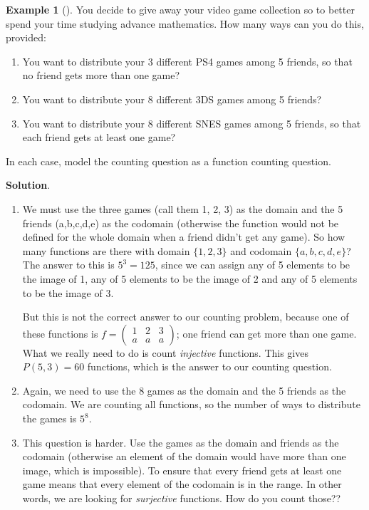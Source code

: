 \documentclass[10pt,]{book}
\theoremstyle{plain}
\theoremstyle{definition}
\theoremstyle{definition}
\newtheorem{example}[theorem]{Example}
\theoremstyle{definition}
\theoremstyle{definition}
\numberwithin{equation}{chapter}
\newcommand{\twoline}[2]{\begin{pmatrix}#1 \\ #2 \end{pmatrix}}
\newcommand{\amp}{&}
\begin{document}
\begin{example}[]\label{example-16}
\hypertarget{p-989}{}%
You decide to give away your video game collection so to better spend your time studying advance mathematics. How many ways can you do this, provided: \leavevmode%
\begin{enumerate}
\item\hypertarget{li-138}{}You want to distribute your 3 different PS4 games among 5 friends, so that no friend gets more than one game?%
\item\hypertarget{li-139}{}You want to distribute your 8 different 3DS games among 5 friends?%
\item\hypertarget{li-140}{}You want to distribute your 8 different SNES games among 5 friends, so that each friend gets at least one game?%
\end{enumerate}
 In each case, model the counting question as a function counting question.%
\par\smallskip%
\noindent\textbf{Solution}.\hypertarget{solution-83}{}\quad%
\hypertarget{p-990}{}%
\leavevmode%
\begin{enumerate}
\item\hypertarget{li-141}{}\hypertarget{p-991}{}%
We must use the three games (call them 1, 2, 3) as the domain and the 5 friends (a,b,c,d,e) as the codomain (otherwise the function would not be defined for the whole domain when a friend didn't get any game).  So how many functions are there with domain \(\{1,2,3\}\) and codomain \(\{a,b,c,d,e\}\)?  The answer to this is \(5^3=125\), since we can assign any of 5 elements to be the image of 1, any of 5 elements to be the image of 2 and any of 5 elements to be the image of 3.%
\par
\hypertarget{p-992}{}%
But this is not the correct answer to our counting problem, because one of these functions is \(f= \twoline{1\amp 2\amp 3}{a\amp a\amp a}\); one friend can get more than one game.  What we really need to do is count \emph{injective} functions.  This gives \(P(5,3) = 60\) functions, which is the answer to our counting question.%
\item\hypertarget{li-142}{}\hypertarget{p-993}{}%
Again, we need to use the 8 games as the domain and the 5 friends as the codomain.  We are counting all functions, so the number of ways to distribute the games is \(5^8\).%
\item\hypertarget{li-143}{}\hypertarget{p-994}{}%
This question is harder.  Use the games as the domain and friends as the codomain (otherwise an element of the domain would have more than one image, which is impossible).  To ensure that every friend gets at least one game means that every element of the codomain is in the range.  In other words, we are looking for \emph{surjective} functions. How do you count those??%
\end{enumerate}
%
\end{example}
\end{document}
